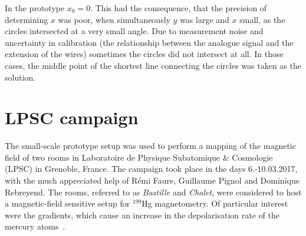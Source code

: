 In the prototype $x_0 = 0$. This had the consequence, that the precision of determining $x$ was poor, when simultaneously $y$ was large and $x$ small, as the circles intersected at a very small angle. Due to measurement noise and uncertainty in calibration (the relationship between the analogue signal and the extension of the wires) sometimes the circles did not intersect at all. In those cases, the middle point of the shortest line connecting the circles was taken as the solution.










\section{LPSC campaign}
The small-scale prototype setup was used to perform a mapping of the magnetic field of two rooms in Laboratoire de Physique Subatomique \& Cosmologie (LPSC) in Grenoble, France. The campaign took place in the days 6.-10.03.2017, with the much appreciated help of Rémi Faure, Guillaume Pignol and Dominique Rebreyend. The rooms, referred to as \emph{Bastille} and \emph{Chalet}, were considered to host a magnetic-field sensitive setup for ${}^{199}$Hg magnetometry. Of particular interest were the gradients, which cause an increase in the depolarisation rate of the mercury atoms~\cite{FertlThesis}.

